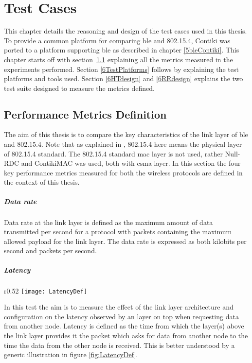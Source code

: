 \chapter{Test Cases} \label{6Testing}

This chapter details the reasoning and design of the test cases used in this thesis. To provide a common platform for comparing \gls{ble} and 802.15.4, Contiki was ported to a platform supporting \gls{ble} as described in chapter \ref{5bleContiki}. This chapter starts off with section\ \ref{6Metrics} explaining all the metrics measured in the experiments performed. Section \ref{6TestPlatforms} follows  by explaining the test platforms and tools used. Section \ref{6HTdesign} and \ref{6RRdesign} explains the two test suite designed to measure the metrics defined.


\section{Performance Metrics Definition} \label{6Metrics}
The aim of this thesis is to compare the key characteristics of the link layer of \gls{ble}  and 802.15.4. Note that as explained in , 802.15.4 here means the physical layer of 802.15.4 standard. The 802.15.4 standard \gls{mac} layer is not used, rather Null-RDC and ContikiMAC was used, both with \gls{csma} layer. In this section the four key performance metrics measured for both the wireless protocols are defined in the context of this thesis.

\paragraph{Data rate}
Data rate at the link layer is defined as the maximum amount of data transmitted per second for a protocol with packets containing the maximum allowed payload for the link layer. The data rate is expressed as both kilobits per second and packets per second.

\paragraph{Latency}  \label{6para:latency}
\begin{wrapfigure}{r}{0.52\textwidth}
	\vspace{-10pt}
	\centering
	\texttt{[image: LatencyDef]}
	\caption{Illustration of latency measurement}
	\vspace{-10pt}
	\label{fig:LatencyDef}
\end{wrapfigure}
In this test the aim is to measure the effect of the link layer architecture and configuration on the latency observed by an layer on top when requesting data from another node. Latency is defined as the time from which the layer(s) above the link layer provides it the packet which asks for data from another node to the time the data from the other node is received. This is better understood by a generic illustration in figure \ref{fig:LatencyDef}.

